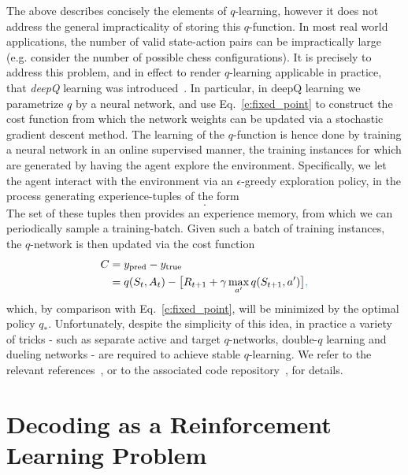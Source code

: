 \documentclass[twocolumn,preprintnumbers,amsmath,amssymb,notitlepage,nofootinbib,longbibliography,superscriptaddress,aps,pra,10pt]{revtex4-1}
\newcommand{\je}[1]{\textcolor{cyan}{#1}}
\begin{document}
	The above describes concisely the elements of $q$-learning, however it does not address the general impracticality of storing this $q$-function.
	In most real world applications, the number of valid state-action pairs can be impractically large (e.g. consider the number of possible chess configurations).
	It is precisely to address this problem, and in effect to render $q$-learning applicable in practice, that \textit{deepQ} learning was introduced~\cite{RLMnih15,RLvan2016deep,RLschaul2015prioritized}.
	In particular, in deepQ learning we parametrize $q$ by a neural network, and use Eq.~\eqref{e:fixed_point} to construct the cost function from which the network weights can be updated via a stochastic gradient descent method.
	The learning of the $q$-function is hence done by training a neural network in an online supervised manner, the training instances for which are generated by having the agent explore the environment.
	Specifically, we let the agent interact with the environment via an $\epsilon$-greedy exploration policy, in the process generating experience-tuples of the form
	\begin{equation}
		[S_t,A_t,R_{t+1},S_{t+1},T_{t+1}].
	\end{equation}
	The set of these tuples then provides an experience memory, from which we can periodically sample a training-batch.
	Given such a batch of training instances, the $q$-network is then updated via the cost function
	\begin{align} 
		C &= y_{\mathrm{pred}} - y_{\mathrm{true}}\\
		&= q(S_t,A_t) - \big[R_{t+1} + \gamma\max_{a'}q(S_{t+1},a') \big]\je{,}
	\end{align}
	which, by comparison with Eq.~\eqref{e:fixed_point}, will be minimized by the optimal policy $q_*$.
	Unfortunately, despite the simplicity of this idea, in practice a variety of tricks - such as separate active and target $q$-networks, double-$q$ learning and dueling networks - are required to achieve stable $q$-learning.
	We refer to the relevant references~\cite{RLMnih15,RLvan2016deep,RLschaul2015prioritized,RLwang2015dueling}, or to the associated code repository~\cite{DeepQDecoding}, for details.

\section{Decoding as a Reinforcement Learning Problem}\label{s:decoding_as_rl}
\end{document}
